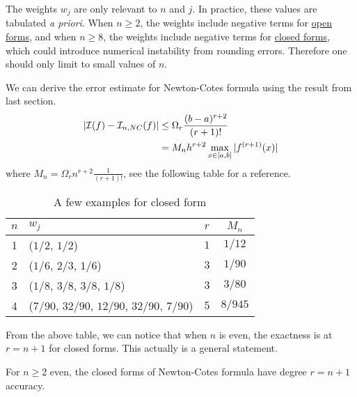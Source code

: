 The weights $w_j$ are only relevant to $n$ and $j$. In practice, these values are tabulated \emph{a priori}. When $n\ge 2$, the weights include negative terms for \underline{open forms}, and when $n\ge 8$, the weights include negative terms for \underline{closed forms}, which could introduce numerical instability from rounding errors. Therefore one should only limit to small values of $n$.
\begin{remark}
    We can derive the error estimate for Newton-Cotes formula using the result from last section. 
    \begin{equation}
        \begin{aligned}
            |\mathcal I(f) - \mathcal I_{n,NC}(f)| &\le \Omega_r \frac{(b-a)^{r+2}}{(r+1)!}\\
&= M_n  h^{r+2} \max_{x\in[a, b]} |f^{(r+1)}(x)| 
    \end{aligned}
    \end{equation}
    where $M_n = \Omega_r n^{r+2}\frac{1}{(r+1)!}$, see the following table for a reference.
\end{remark}
\begin{table}[!htb]
    \caption{A few examples for closed form}
    \vspace{0.2cm}
    \centering
        \begin{tabular}{ c| l c  c}
            \hline 
            $n$ & $w_j$ & $r$ & $M_n$ \\ 
            \hline 
            \hline 
            1 & ($1/2$, $1/2$) & $1$ & $1/12$\\  
            2 &  ($1/6$, $2/3$, $1/6$)  & $3$ & $1/90$ \\
            3 & ($1/8$, $3/8$, $3/8$, $1/8$)& $3$ & $3/80$\\
            4 & ($7/90$, $32/90$, $12/90$, $32/90$, $7/90$) & $5$ & $8/945$\\
            \hline
           \end{tabular}
    \end{table}
    From the above table, we can notice that when $n$ is even, the exactness is at $r = n+1$ for closed forms. This actually is a general statement. 
\begin{lemma}
    For $n\ge 2$ even, the closed forms of Newton-Cotes formula have degree $r = n+1$ accuracy.
\end{lemma}
